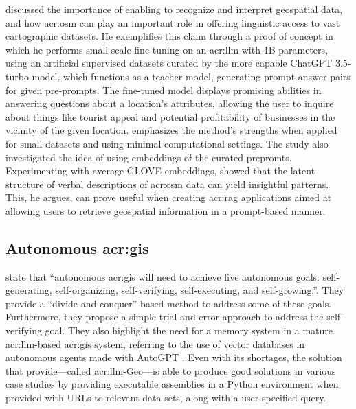 \cite{unluChatmapLargeLanguage2023} discussed the importance of enabling  to recognize and interpret geospatial data, and how \gls{acr:osm} can play an important role in offering  linguistic access to vast cartographic datasets. He exemplifies this claim through a proof of concept in which he performs small-scale fine-tuning on an \acrshort{acr:llm} with 1B parameters, using an artificial supervised datasets curated by the more capable ChatGPT 3.5-turbo model, which functions as a teacher model, generating prompt-answer pairs for given pre-prompts. The fine-tuned model displays promising abilities in answering questions about a location's attributes, allowing the user to inquire about things like tourist appeal and potential profitability of businesses in the vicinity of the given location. \citeauthor{unluChatmapLargeLanguage2023} emphasizes the method's strengths when applied for small datasets and using minimal computational settings. The study also investigated the idea of using embeddings of the curated prepromts. Experimenting with average GLOVE embeddings, \citeauthor{unluChatmapLargeLanguage2023} showed that the latent structure of verbal descriptions of \gls{acr:osm} data can yield insightful patterns. This, he argues, can prove useful when creating \acrfull{acr:rag} applications aimed at allowing users to retrieve geospatial information in a prompt-based manner.

\subsection[Autonomous GIS]{Autonomous \acrshort{acr:gis}}

\cite{liAutonomousGISNextgeneration2023} state that \enquote{autonomous \acrshort{acr:gis} will need to achieve five autonomous goals: self-generating, self-organizing, self-verifying, self-executing, and self-growing.}. They provide a \enquote{divide-and-conquer}-based method to address some of these goals. Furthermore, they propose a simple trial-and-error approach to address the self-verifying goal. They also highlight the need for a memory system in a mature \acrshort{acr:llm}-based \acrshort{acr:gis} system, referring to the use of vector databases in autonomous agents made with AutoGPT \citep{richardAutoGPTHeartOpensource2023}. Even with its shortages, the solution that \cite{liAutonomousGISNextgeneration2023} provide---called \acrshort{acr:llm}-Geo---is able to produce good solutions in various case studies by providing executable assemblies in a Python environment when provided with URLs to relevant data sets, along with a user-specified query.

